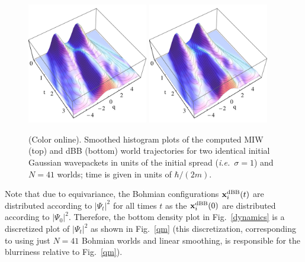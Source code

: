 \documentclass[twocolumn,aps,pra,amsmath,amssymb,superscriptaddress]{revtex4}
\newcommand{\ie}{{\em i.e.}}
\renewcommand{\(}{\left(}
\renewcommand{\)}{\right)}
\newcommand{\blk}{\color{black}}
\begin{document}
\begin{figure}[!t]
	\includegraphics[width=0.47\textwidth]{MIW_histogram.jpg}
	\includegraphics[width=0.47\textwidth]{dBB_histogram.jpg}
    \caption{\label{dynamics3d} (Color online).
     Smoothed histogram
        plots of the computed MIW (top) and dBB (bottom) world trajectories for
        two identical initial Gaussian wavepackets in units of the initial spread (\ie~$\sigma=1$) \blk  and $N=41$
    worlds; time is given in units of $\hbar/(2m)$.\blk}
\end{figure}
Note that due to equivariance, the Bohmian
configurations ${\bf x}^{\mathrm{dBB}}_{i}(t)$ are distributed according to
$|\Psi_t|^2$ for all times $t$ as the ${\bf x}^{\mathrm{dBB}}_i(0)$ are distributed according to
$|\Psi_0|^2$. Therefore, the bottom  density plot  in Fig.~\ref{dynamics} is a discretized plot of
$|\Psi_t|^2$ as shown in Fig.~\ref{qm}  (this discretization, corresponding
to using just $N=41$ Bohmian worlds and linear smoothing, is responsible for the
blurriness relative to Fig.~\ref{qm}). 
\end{document}

